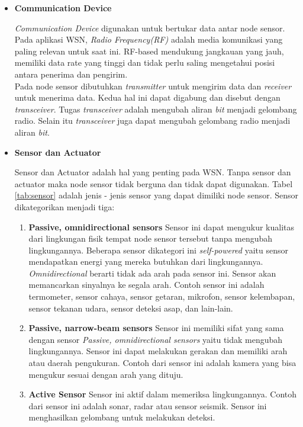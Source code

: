 \documentclass[a4paper,twoside]{article}
\begin{document}
\begin{enumerate}
\begin{itemize}
\begin{itemize}
\item \textbf{Communication Device}

\textit{Communication Device} digunakan untuk bertukar data antar node sensor. Pada aplikasi WSN, \textit{Radio Frequency(RF)} adalah media komunikasi yang paling relevan untuk saat ini. RF-based mendukung jangkauan yang jauh, memiliki data rate yang tinggi dan tidak perlu saling mengetahui posisi antara penerima dan pengirim.
\\
Pada node sensor dibutuhkan \textit{transmitter} untuk mengirim data dan \textit{receiver} untuk menerima data. Kedua hal ini dapat digabung dan disebut dengan \textit{transceiver}. Tugas \textit{transceiver} adalah mengubah aliran \textit{bit} menjadi gelombang radio. Selain itu \textit{transceiver} juga dapat mengubah gelombang radio menjadi aliran \textit{bit}.
\end{itemize}

\begin{itemize}
\item \textbf{Sensor dan Actuator}

Sensor dan Actuator adalah hal yang penting pada WSN. Tanpa sensor dan actuator maka node sensor tidak berguna dan tidak dapat digunakan. Tabel \ref{tab:sensor} adalah jenis - jenis sensor yang dapat dimiliki node sensor. Sensor dikategorikan menjadi tiga:
\begin{enumerate}
	\item \textbf{Passive, omnidirectional sensors} Sensor ini dapat mengukur kualitas dari lingkungan fisik tempat node sensor tersebut tanpa mengubah lingkungannya. Beberapa sensor dikategori ini \textit{self-powered} yaitu sensor mendapatkan energi yang mereka butuhkan dari lingkungannya. \textit{Omnidirectional} berarti tidak ada arah pada sensor ini. Sensor akan memancarkan sinyalnya ke segala arah. Contoh sensor ini adalah termometer, sensor cahaya, sensor getaran, mikrofon, sensor kelembapan, sensor tekanan udara, sensor deteksi asap, dan lain-lain.
	\item \textbf{Passive, narrow-beam sensors} Sensor ini memiliki sifat yang sama dengan sensor \textit{Passive, omnidirectional sensors} yaitu tidak mengubah lingkungannya. Sensor ini dapat melakukan gerakan dan memiliki arah atau daerah pengukuran. Contoh dari sensor ini adalah kamera yang bisa mengukur sesuai dengan arah yang dituju.
	\item \textbf{Active Sensor} Sensor ini aktif dalam memeriksa lingkungannya. Contoh dari sensor ini adalah sonar, radar atau sensor seismik. Sensor ini menghasilkan gelombang untuk melakukan deteksi.
\end{enumerate}


\end{itemize}
\end{itemize}
\end{enumerate}
\end{document}
